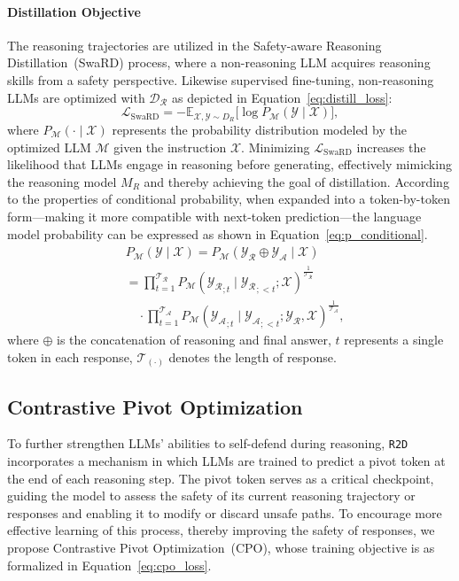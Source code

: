 \paragraph{Distillation Objective} The reasoning trajectories are utilized in the Safety-aware Reasoning Distillation~(SwaRD) process, where a non-reasoning LLM acquires reasoning skills from a safety perspective. Likewise supervised fine-tuning, non-reasoning LLMs are optimized with $\mathcal{D_R}$ as depicted in Equation~\ref{eq:distill_loss}:
\begin{equation}
\label{eq:distill_loss}
    \mathcal{L}_{\text{SwaRD}} = - \mathbb{E}_{\mathcal{X}, \mathcal{Y} \sim D_R} \Big[ \log P_{\mathcal{M}}(\mathcal{Y} \mid \mathcal{X}) \Big],
\end{equation}
where $P_{\mathcal{M}}(\cdot\mid \mathcal{X})$ represents the probability distribution modeled by the optimized LLM $\mathcal{M}$ given the instruction $\mathcal{X}$. Minimizing $\mathcal{L}_{\text{SwaRD}}$ increases the likelihood that LLMs engage in reasoning before generating, effectively mimicking the reasoning model $M_R$ and thereby achieving the goal of distillation. According to the properties of conditional probability, when expanded into a token-by-token form—making it more compatible with next-token prediction—the language model probability can be expressed as shown in Equation~\ref{eq:p_conditional}.
\begin{equation}
\label{eq:p_conditional}
\begin{aligned}
&P_{\mathcal{M}}(\mathcal{Y} \mid \mathcal{X}) = P_{\mathcal{M}}(\mathcal{Y_R \oplus Y_A} \mid \mathcal{X}) \\
&= \prod_{t=1}^{\mathcal{T_R}} P_{\mathcal{M}}(\mathcal{Y_R}_{;t} \mid \mathcal{Y_R}_{;<t}; \mathcal{X})^{\frac{1}{\mathcal{T_R}}} \\
&\quad \cdot \prod_{t=1}^{\mathcal{T_A}} P_{\mathcal{M}}(\mathcal{Y_A}_{;t} \mid \mathcal{Y_A}_{;<t}; \mathcal{Y_R}, \mathcal{X})^{\frac{1}{\mathcal{T_A}}},
\end{aligned}
\end{equation}
where $\oplus$ is the concatenation of reasoning and final answer, $t$ represents a single token in each response, $\mathcal{T}_{(\cdot)}$ denotes the length of response.

\subsection{Contrastive Pivot Optimization}
To further strengthen LLMs' abilities to self-defend during reasoning, \texttt{R2D} incorporates a mechanism in which LLMs are trained to predict a pivot token at the end of each reasoning step. The pivot token serves as a critical checkpoint, guiding the model to assess the safety of its current reasoning trajectory or responses and enabling it to modify or discard unsafe paths. To encourage more effective learning of this process, thereby improving the safety of responses, we propose Contrastive Pivot Optimization~(CPO), whose training objective is as formalized in Equation~\ref{eq:cpo_loss}. 

